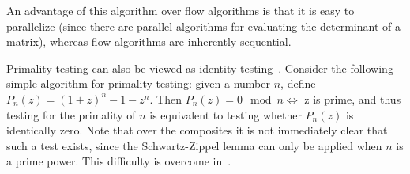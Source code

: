 \documentclass{article}
\begin{document}
An advantage of this algorithm over flow algorithms is that it is easy
to parallelize (since there are parallel algorithms for evaluating the
determinant of a matrix), whereas flow algorithms are inherently
sequential.


Primality testing can also be viewed as identity
testing~\cite{AgrawalBiswas:2003}. Consider the following simple
algorithm for primality testing: given a number $n$, define
$P_n(z)=(1+z)^{n}-1-z^n$. Then $P_n(z)=0 \mod n \iff$ z is prime, and
thus testing for the primality of $n$ is equivalent to testing whether
$P_n(z)$ is identically zero. Note that over the composites it is not
immediately clear that such a test exists, since the Schwartz-Zippel
lemma can only be applied when $n$ is a prime power. This difficulty
is overcome in~\cite{AgrawalBiswas:2003}.

 
\end{document}
